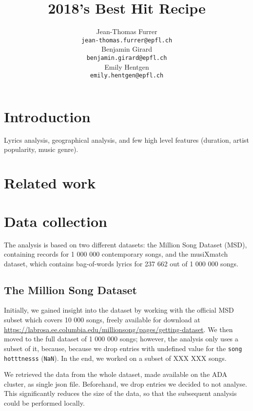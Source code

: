 \documentclass[11pt]{article}
\title{2018's Best Hit Recipe}
\author{Jean-Thomas Furrer \\
  {\small\tt jean-thomas.furrer@epfl.ch} \\\And
  Benjamin Girard \\
  {\small\tt benjamin.girard@epfl.ch} \\\And
  Emily Hentgen \\
{\small\tt emily.hentgen@epfl.ch} \\}
\date{}
\renewcommand\_{\textunderscore\allowbreak}
\begin{document}
\maketitle
\begin{abstract}

\end{abstract}


\section{Introduction}


Lyrics analysis, geographical analysis, and few high level features (duration, artist popularity, music genre).

\section{Related work}

\section{Data collection}
The analysis is based on two different datasets: the Million Song Dataset (MSD), containing records for 1 000 000 contemporary songs, and the musiXmatch dataset, which contains bag-of-words lyrics for 237 662 out of 1 000 000 songs.

\subsection{The Million Song Dataset}
Initially, we gained insight into the dataset by working with the official MSD subset which covers 10 000 songs, freely available for download at \url{https://labrosa.ee.columbia.edu/millionsong/pages/getting-dataset}.
We then moved to the full dataset of 1 000 000 songs; however, the analysis only uses a subset of it, because, because we drop entries with undefined value for the \texttt{song hotttnesss} (\texttt{NaN}).
In the end, we worked on a subset of XXX XXX songs.

We retrieved the data from the whole dataset, made available on the ADA cluster, as single json file. Beforehand, we drop entries we decided to not analyse. 
This significantly reduces the size of the data, so that the subsequent analysis could be performed locally.
\end{document}
